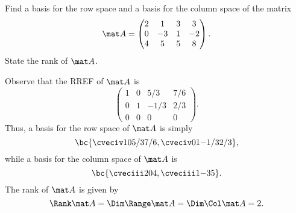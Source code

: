 \begin{problem}
    Find a basis for the row space and a basis for the column space of the matrix \[\mat A = \begin{pmatrix}2 & 1 & 3 & 3 \\ 0 & -3 & 1 & -2 \\ 4 & 5 & 5 & 8\end{pmatrix}.\] State the rank of $\mat A$.
\end{problem}
\begin{solution}
    Observe that the RREF of $\mat A$ is \[\begin{pmatrix}1 & 0 & 5/3 & 7/6 \\ 0 & 1 & -1/3 & 2/3 \\ 0 & 0 & 0 & 0\end{pmatrix}.\] Thus, a basis for the row space of $\mat A$ is simply \[\bc{\cveciv10{5/3}{7/6}, \cveciv01{-1/3}{2/3}},\] while a basis for the column space of $\mat A$ is \[\bc{\cveciii204, \cveciii1{-3}{5}}.\] The rank of $\mat A$ is given by \[\Rank \mat A = \Dim \Range \mat A = \Dim \Col \mat A = 2.\]
\end{solution}

